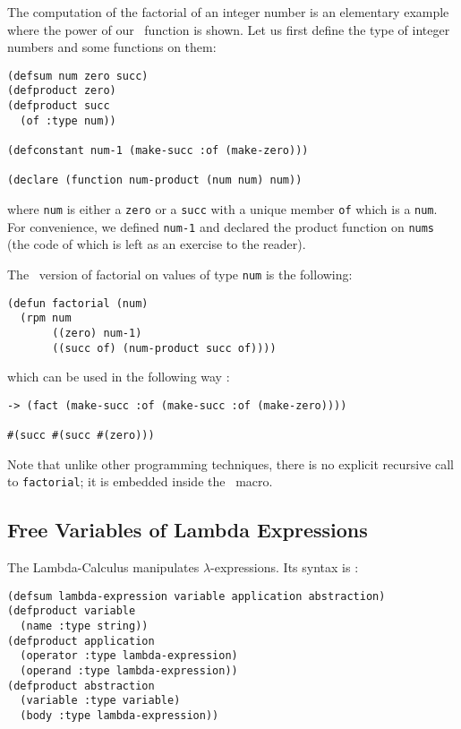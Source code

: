 \begin{sloppypar}
The computation of the factorial of an integer number is an elementary
example where the power of our \rpm\ function is shown. Let us first
define the type of integer numbers and some functions on them:
\begin{verbatim}
(defsum num zero succ)
(defproduct zero)
(defproduct succ 
  (of :type num))

(defconstant num-1 (make-succ :of (make-zero)))

(declare (function num-product (num num) num))
\end{verbatim}
where {\tt num} is either a {\tt zero} or a {\tt succ} with a
unique member {\tt of} which is a {\tt num}. For convenience, we
defined {\tt num-1} and declared the product function on {\tt nums}
(the code of which is left as an exercise to the reader).

The \rpm\ version of factorial on values of type {\tt num} is the
following:
\begin{verbatim}
(defun factorial (num)
  (rpm num
       ((zero) num-1)
       ((succ of) (num-product succ of))))
\end{verbatim}
which can be used in the following way :
\begin{verbatim}
-> (fact (make-succ :of (make-succ :of (make-zero))))

#(succ #(succ #(zero)))
\end{verbatim}
Note that unlike other programming techniques, there is no explicit
recursive call to {\tt factorial}; it is embedded inside the 
\rpm\ macro.

\subsection{Free Variables of Lambda Expressions}

The Lambda-Calculus manipulates $\lambda$-expressions. Its syntax is : 
\begin{verbatim}
(defsum lambda-expression variable application abstraction)
(defproduct variable
  (name :type string))
(defproduct application
  (operator :type lambda-expression)
  (operand :type lambda-expression))
(defproduct abstraction
  (variable :type variable)
  (body :type lambda-expression))


\end{verbatim}
\end{sloppypar}
